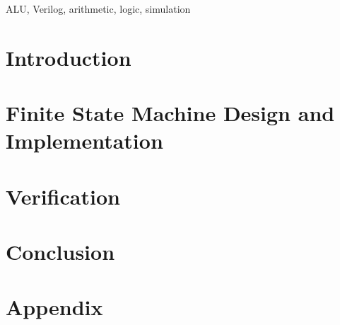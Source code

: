 \documentclass[conference]{IEEEtran}
\begin{document}
    \begin{IEEEkeywords}
        ALU, Verilog, arithmetic, logic, simulation
    \end{IEEEkeywords}


    \section{Introduction}\label{sec:introduction}
    


    \section{Finite State Machine Design and Implementation}\label{sec:FSM}
    


    \section{Verification}\label{sec:verification}
    


    \section{Conclusion}\label{sec:conclusion}
    

    \appendix


    \section{Appendix}\label{sec:appendix}
    
\end{document}

